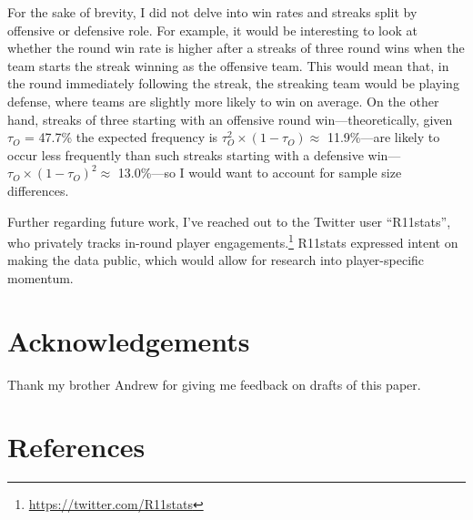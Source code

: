 \documentclass{article}
\begin{document}
For the sake of brevity, I did not delve into win rates and streaks
split by offensive or defensive role. For example, it would be
interesting to look at whether the round win rate is higher after a
streaks of three round wins when the team starts the streak winning as
the offensive team. This would mean that, in the round immediately
following the streak, the streaking team would be playing defense, where
teams are slightly more likely to win on average. On the other hand,
streaks of three starting with an offensive round win---theoretically,
given \(\tau_O\) = 47.7\% the expected frequency is
\(\tau_O^2 \times (1 - \tau_O) \approx\) 11.9\%---are likely to occur
less frequently than such streaks starting with a defensive
win---\(\tau_O \times (1 - \tau_O)^2 \approx\) 13.0\%---so I would want
to account for sample size differences.

Further regarding future work, I've reached out to the Twitter user
``R11stats'', who privately tracks in-round player
engagements.\footnote{\url{https://twitter.com/R11stats}} R11stats
expressed intent on making the data public, which would allow for
research into player-specific momentum.

\hypertarget{acknowledgements}{%
\section*{Acknowledgements}\label{acknowledgements}}

Thank my brother Andrew for giving me feedback on drafts of this paper.

\hypertarget{references}{%
\section*{References}\label{references}}
\end{document}
